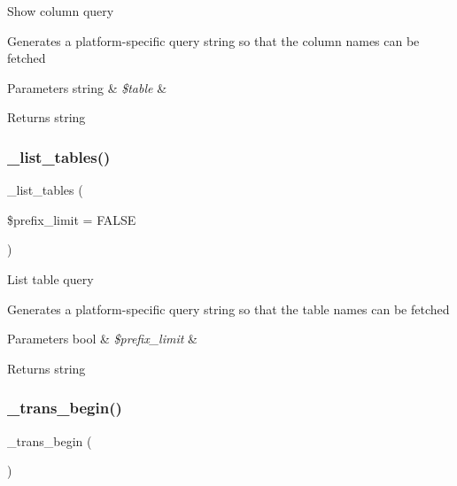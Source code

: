 Show column query

Generates a platform-\/specific query string so that the column names can be fetched


\begin{DoxyParams}[1]{Parameters}
string & {\em \$table} & \\
\hline
\end{DoxyParams}
\begin{DoxyReturn}{Returns}
string 
\end{DoxyReturn}
\mbox{\label{class_c_i___d_b__cubrid__driver_a435c0f3ce54fe7daa178baa8532ebd54}} 
\subsubsection{\texorpdfstring{\+\_\+list\+\_\+tables()}{\_list\_tables()}}
{\footnotesize\ttfamily \+\_\+list\+\_\+tables (\begin{DoxyParamCaption}\item[{}]{\$prefix\+\_\+limit = {\ttfamily FALSE} }\end{DoxyParamCaption})\hspace{0.3cm}{\ttfamily [protected]}}

List table query

Generates a platform-\/specific query string so that the table names can be fetched


\begin{DoxyParams}[1]{Parameters}
bool & {\em \$prefix\+\_\+limit} & \\
\hline
\end{DoxyParams}
\begin{DoxyReturn}{Returns}
string 
\end{DoxyReturn}
\mbox{\label{class_c_i___d_b__cubrid__driver_ac81ac882c1d54347d810199a15856aac}} 
\subsubsection{\texorpdfstring{\+\_\+trans\+\_\+begin()}{\_trans\_begin()}}
{\footnotesize\ttfamily \+\_\+trans\+\_\+begin (\begin{DoxyParamCaption}{ }\end{DoxyParamCaption})\hspace{0.3cm}{\ttfamily [protected]}}

